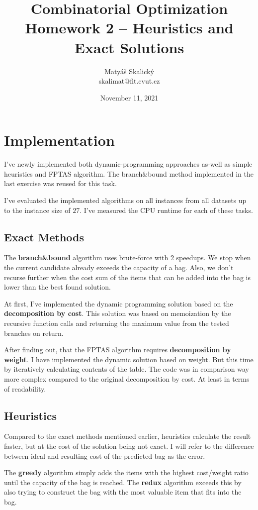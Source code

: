 \documentclass[a4paper,10pt]{article}
\title{Combinatorial Optimization\\Homework 2 – Heuristics and Exact Solutions}
\author{Matyáš Skalický\\skalimat@fit.cvut.cz}
\begin{document}
\date{November 11, 2021}
\maketitle
\tableofcontents
\medskip


\section{Implementation}
I've newly implemented both dynamic-programming approaches as-well as simple heuristics and FPTAS algorithm. The branch\&bound method implemented in the last exercise was reused for this task.

I've evaluated the implemented algorithms on all instances from all datasets up to the instance size of $27$. I've measured the CPU runtime for each of these tasks.

\subsection{Exact Methods}

The \textbf{branch\&bound} algorithm uses brute-force with 2 speedups. We stop when the current candidate already exceeds the capacity of a bag. Also, we don't recurse further when the cost sum of the items that can be added into the bag is lower than the best found solution.

At first, I've implemented the dynamic programming solution based on the \textbf{decomposition by cost}. This solution was based on memoization by the recursive function calls and returning the maximum value from the tested branches on return.

After finding out, that the FPTAS algorithm requires \textbf{decomposition by weight}. I have implemented the dynamic solution based on weight. But this time by iteratively calculating contents of the table. The code was in comparison way more complex compared to the original decomposition by cost. At least in terms of readability.

\subsection{Heuristics}

Compared to the exact methods mentioned earlier, heuristics calculate the result faster, but at the cost of the solution being not exact. I will refer to the difference between ideal and resulting cost of the predicted bag as the error.

The \textbf{greedy} algorithm simply adds the items with the highest cost/weight ratio until the capacity of the bag is reached. The \textbf{redux} algorithm exceeds this by also trying to construct the bag with the most valuable item that fits into the bag.
\end{document}
